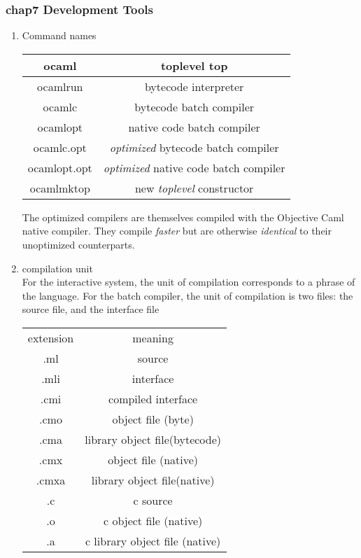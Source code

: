 \subsubsection{chap7 Development Tools}
\label{sec:chap7-devel-tools}
\begin{enumerate}

\item Command names  \\
  
  \begin{tabular}{|c|c|}
    \hline
    ocaml & toplevel top \\
    \hline
    ocamlrun & bytecode interpreter \\
    \hline
    ocamlc & bytecode batch compiler \\
    \hline
    ocamlopt & native code batch compiler \\
    \hline
    ocamlc.opt & \textit{optimized} bytecode batch compiler \\
    \hline
    ocamlopt.opt & \textit{optimized} native code batch compiler \\
    \hline
    ocamlmktop & new \textit{toplevel} constructor \\
    \hline
  \end{tabular}

  The optimized compilers are themselves compiled with the Objective Caml native compiler.
  They compile \textit{faster} but are otherwise \textit{identical} to their unoptimized counterparts.
\item compilation unit \\
  For the interactive system, the unit of compilation corresponds to a phrase of the language. For the batch compiler, the unit of compilation is two files: the source file, and the interface file
  
  \begin{tabular}{|c|c|}
    \hline
    extension & meaning \\
    .ml & source \\
    .mli & interface \\
    .cmi & compiled interface \\
    .cmo & object file (byte) \\
    .cma & library object file(bytecode) \\
    .cmx & object file (native) \\
    .cmxa & library object file(native) \\
    \hline
    .c & c source \\
    .o & c object file (native) \\
    .a & c library object file (native) \\
    \hline
  \end{tabular}


\end{enumerate}
